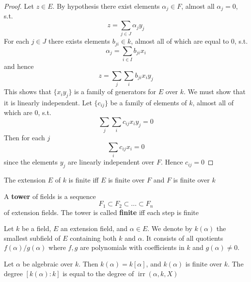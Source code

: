 \documentclass[11pt]{article}
\def \irr {\operatorname{irr}}
\begin{document}
\begin{proof}
Let \(z\in E\). By hypothesis there exist elements \(\alpha_j\in F\), almost all \(\alpha_j=0\), s.t.
\begin{equation*}
z=\sum_{j\in J}\alpha_jy_j
\end{equation*}
For each \(j\in J\) there exists elements \(b_{ji}\in k\), almost all of which are equal to 0, s.t.
\begin{equation*}
\alpha_j=\sum_{i\in I}b_{ji}x_i
\end{equation*}
and hence
\begin{equation*}
z=\sum_j\sum_ib_{ji}x_iy_j
\end{equation*}
This shows that \(\{x_iy_j\}\) is a family of generators for \(E\) over \(k\). We must show that it
is linearly independent. Let \(\{c_{ij}\}\) be a family of elements of \(k\), almost all of which
are 0, s.t.
\begin{equation*}
\sum_j\sum_ic_{ij}x_iy_j=0
\end{equation*}
Then for each \(j\)
\begin{equation*}
\sum_ic_{ij}x_i=0
\end{equation*}
since the elements \(y_j\) are linearly independent over \(F\). Hence \(c_{ij}=0\)
\end{proof}

\begin{corollary}[]
\label{cor5.1.3}
The extension \(E\) of \(k\) is finite iff \(E\) is finite over \(F\) and \(F\) is finite over \(k\)
\end{corollary}

A \textbf{tower} of fields is a sequence
\begin{equation*}
F_1\subset F_2\subset\dots\subset F_n
\end{equation*}
of extension fields. The tower is called \textbf{finite} iff each step is finite

Let \(k\) be a field, \(E\) an extension field, and \(\alpha\in E\). We denote by \(k(\alpha)\) the smallest
subfield of \(E\) containing both \(k\) and \(\alpha\). It consists of all quotients \(f(\alpha)/g(\alpha)\)
where \(f,g\) are polynomials with coefficients in \(k\) and \(g(\alpha)\neq 0\).

\begin{proposition}[]
\label{prop5.1.4}
Let \(\alpha\) be algebraic over \(k\). Then \(k(\alpha)=k[\alpha]\), and \(k(\alpha)\) is finite over \(k\). The
degree \([k(\alpha):k]\) is equal to the degree of \(\irr(\alpha,k,X)\)
\end{proposition}
\end{document}
